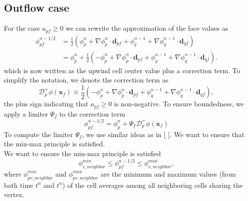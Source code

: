 \documentclass{article}
\begin{document}
\subsection{Outflow case}
For the case $ a_{pf} \geq 0 $ we can rewrite the approximation of the face values as
\begin{equation}
	\label{faceval}
	\begin{split}
		\phi_{pf}^{n-1/2}
		&= \frac{1}{2}(\phi_p^n + \nabla\phi_p^n\cdot\boldsymbol{d}_{pf} + 
		\phi_q^{n-1} + \nabla\phi_q^{n-1}\cdot\boldsymbol{d}_{qf}) \\
		&= \phi_p^n + \frac{1}{2}(-\phi_p^n + \nabla\phi_p^n\cdot\boldsymbol{d}_{pf} + 
		\phi_q^{n-1} + \nabla\phi_q^{n-1}\cdot\boldsymbol{d}_{qf}).
	\end{split}
\end{equation}
which is now written as the upwind cell center value plus a correction term. 
To simplify the notation, we denote the correction term as
\[
	\mathcal{D}^+_p\phi(\boldsymbol{x}_f)
	\equiv 
	\frac{1}{2}(-\phi_p^n + \nabla\phi_p^n\cdot\boldsymbol{d}_{pf} + 
	\phi_q^{n-1} + \nabla\phi_q^{n-1}\cdot\boldsymbol{d}_{qf}),
\]
the plus sign indicating that $ a_{pf} \geq 0 $ is non-negative. 
To ensure boundedness, we apply a limiter $ \Psi_{f} $ to the correction term
\begin{equation} \label{rec_face}
	\phi_{pf}^{n-1/2} = \phi_p^n + \Psi_{f} \mathcal{D}^+_p\phi(\boldsymbol{x}_f)
\end{equation}
To compute the limiter $ \Psi_{f} $, we use similar ideas as in [ ]. 
We want to ensure that the min-max principle is satisfied.\\ 
We want to ensure the min-max principle is satisfied
\[
	\phi_{v, neighbor}^{min} \leq \phi_{pf}^{n-1/2} \leq \phi_{v, neighbor}^{max},
\]
where $ \phi_{pv, neighbor}^{min} $ and $ \phi_{pv, neighbor}^{max} $ 
are the minimum and maximum values (from both time $ t^n $ and $ t^n $) 
of the cell averages among all neighboring cells sharing the vertex.
\end{document}
